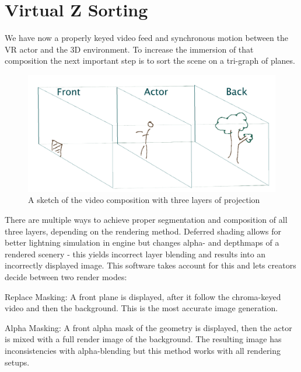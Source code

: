 %
\section{Virtual Z Sorting}


We have now a properly keyed video feed and synchronous motion between the VR 
actor and the 3D environment. To increase the immersion of that composition the 
next important step is to sort the scene on a tri-graph of planes.

\begin{figure}[htb]
	\includegraphics[width=\textwidth]{_raw_resources/composition/Composition-TriGraph.png}
	\caption{A sketch of the video composition with three layers of projection}
	\label{fig:zsort:sketch}
\end{figure}

There are multiple ways to achieve proper segmentation and composition of all 
three layers, depending on the rendering method. Deferred shading allows for 
better lightning simulation in engine but changes alpha- and depthmaps of a 
rendered scenery - this yields incorrect layer blending and results into an 
incorrectly displayed image. This software takes account for this and lets 
creators decide between two render modes:

\begin{my_list}
	\item Replace Masking: A front plane is displayed, after it follow the 
	chroma-keyed video and then the background. This is the most accurate image 
	generation.
	\item Alpha Masking: A front alpha mask of the geometry is displayed, then 
	the actor is mixed with a full render image of the background. The 
	resulting image has inconsistencies with alpha-blending but this method 
	works with all rendering setups.
\end{my_list}

